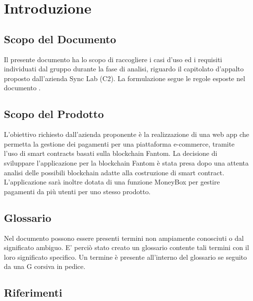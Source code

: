 \section{Introduzione} \label{section:introduzione}

\subsection{Scopo del Documento}
Il presente documento ha lo scopo di raccogliere i casi d'uso ed i requisiti individuati dal gruppo
durante la fase di analisi, riguardo il capitolato d'appalto proposto dall'azienda Sync Lab (C2).
La formulazione segue le regole esposte nel documento \docNameVersionNdP{}.

\subsection{Scopo del Prodotto}
L'obiettivo richiesto dall'azienda proponente è la realizzazione di una web app\glo{} che permetta la gestione dei pagamenti per una piattaforma e-commerce\glo{}, tramite l'uso di smart contracts\glo{} basati sulla blockchain\glo{} Fantom\glo{}.
La decisione di sviluppare l'applicazione per la blockchain\glo{} Fantom\glo{} è stata presa dopo una attenta analisi delle possibili blockchain\glo{} adatte alla costruzione di smart contract\glo{}.
L'applicazione sarà inoltre dotata di una funzione MoneyBox\glo{} per gestire pagamenti da più utenti per uno stesso prodotto.

\subsection{Glossario}
Nel documento possono essere presenti termini non ampiamente conosciuti o dal significato ambiguo.
E' perciò stato creato un glossario contente tali termini con il loro significato specifico.
Un termine è presente all'interno del glossario se seguito da una G corsiva in pedice.

\subsection{Riferimenti}


